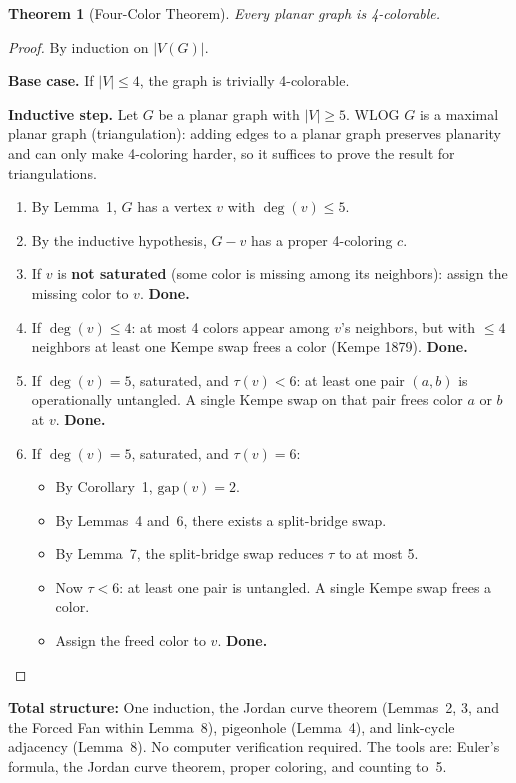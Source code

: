 \documentclass[11pt]{article}
\newtheorem{theorem}{Theorem}
\theoremstyle{remark}
\begin{document}
\begin{theorem}[Four-Color Theorem]
Every planar graph is 4-colorable.
\end{theorem}

\begin{proof}
By induction on $|V(G)|$.

\medskip
\noindent\textbf{Base case.} If $|V| \leq 4$, the graph is trivially 4-colorable.

\medskip
\noindent\textbf{Inductive step.} Let $G$ be a planar graph with $|V| \geq 5$. WLOG $G$ is a maximal planar graph (triangulation): adding edges to a planar graph preserves planarity and can only make 4-coloring harder, so it suffices to prove the result for triangulations.

\begin{enumerate}[label=\arabic*.]
  \item By Lemma~1, $G$ has a vertex $v$ with $\deg(v) \leq 5$.
  \item By the inductive hypothesis, $G - v$ has a proper 4-coloring $c$.
  \item If $v$ is \textbf{not saturated} (some color is missing among its neighbors): assign the missing color to $v$. \textbf{Done.}
  \item If $\deg(v) \leq 4$: at most 4 colors appear among $v$'s neighbors, but with $\leq 4$ neighbors at least one Kempe swap frees a color (Kempe 1879). \textbf{Done.}
  \item If $\deg(v) = 5$, saturated, and $\tau(v) < 6$: at least one pair $(a,b)$ is operationally untangled. A single Kempe swap on that pair frees color $a$ or $b$ at $v$. \textbf{Done.}
  \item If $\deg(v) = 5$, saturated, and $\tau(v) = 6$:
  \begin{itemize}
    \item By Corollary~1, $\mathrm{gap}(v) = 2$.
    \item By Lemmas~4 and~6, there exists a split-bridge swap.
    \item By Lemma~7, the split-bridge swap reduces $\tau$ to at most 5.
    \item Now $\tau < 6$: at least one pair is untangled. A single Kempe swap frees a color.
    \item Assign the freed color to $v$. \textbf{Done.}
  \end{itemize}
\end{enumerate}
\end{proof}

\noindent\textbf{Total structure:} One induction, the Jordan curve theorem (Lemmas~2, 3, and the Forced Fan within Lemma~8), pigeonhole (Lemma~4), and link-cycle adjacency (Lemma~8). No computer verification required. The tools are: Euler's formula, the Jordan curve theorem, proper coloring, and counting to~5.
\end{document}
